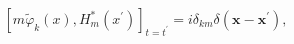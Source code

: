 \begin{equation}
\left[ m\widetilde{\varphi }_k(x),H _{m}^{*}(x^{\prime })\right]
_{t=t^{\prime }}=i\delta _{km}\delta
(\mathbf{x}-\mathbf{x}^{\prime }) ,\label{84}
\end{equation}

